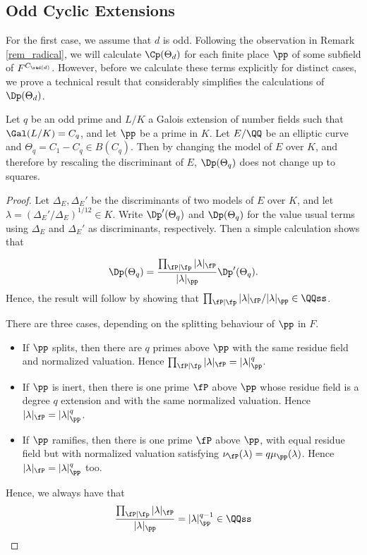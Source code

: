 \subsection{Odd Cyclic Extensions} \label{case_Cp}

For the first case, we assume that $d$ is odd. Following the observation in Remark \ref{rem_radical}, we will calculate $\Cp(\Theta_d)$ for each finite place $\pp$ of some subfield of $F^{C_{\rad(d)}}$. However, before we calculate these terms explicitly for distinct cases, we prove a technical result that considerably simplifies the calculations of $\Dp(\Theta_d)$.

\begin{lemma}
    Let $q$ be an odd prime and $L/K$ a Galois extension of number fields such that $\Gal(L/K)=C_q$, and let $\pp$ be a prime in $K$. Let $E/\QQ$ be an elliptic curve and $\Theta_q=C_1-C_q\in B(C_q)$. Then by changing the model of $E$ over $K$, and therefore by rescaling the discriminant of $E$, $\Dp(\Theta_q)$ does not change up to squares.
\end{lemma}
\begin{proof}
    Let $\Delta_E,\Delta_E'$ be the discriminants of two models of $E$ over $K$, and let $\lambda=(\Delta_E'/\Delta_E)^{1/12}\in K$. Write $\Dp'(\Theta_q)$ and $\Dp(\Theta_q)$ for the value usual terms using $\Delta_E$ and $\Delta_E'$ as discriminants, respectively. Then a simple calculation shows that
    
    $$\Dp(\Theta_q)=\frac{\prod_{\fP\mid\fp}|\lambda|_\fP}{|\lambda|_\pp}\Dp'(\Theta_q).$$
    Hence, the result will follow by showing that $\prod_{\fP\mid\fp}|\lambda|_\fP/|\lambda|_\pp\in\QQss$. 
    
    There are three cases, depending on the splitting behaviour of $\pp$ in $F$. 
    \begin{itemize}
        \item If $\pp$ splits, then there are $q$ primes above $\pp$ with the same residue field and normalized valuation. Hence $\prod_{\fP\mid\fp}|\lambda|_\fP=|\lambda|_\pp^q$.
        \item If $\pp$ is inert, then there is one prime $\fP$ above $\pp$ whose residue field is a degree $q$ extension and with the same normalized valuation. Hence $|\lambda|_\fP=|\lambda|_\pp^q$.
        \item If $\pp$ ramifies, then there is one prime $\fP$ above $\pp$, with equal residue field but with normalized valuation satisfying $\nu_\fP(\lambda)=q\mu_\pp(\lambda)$. Hence $|\lambda|_\fP=|\lambda|_\pp^q$ too.
    \end{itemize}
    Hence, we always have that 
    $$\frac{\prod_{\fP\mid\fp}|\lambda|_\fP}{|\lambda|_\pp}=|\lambda|_\pp^{q-1}\in\QQss$$
\end{proof}


